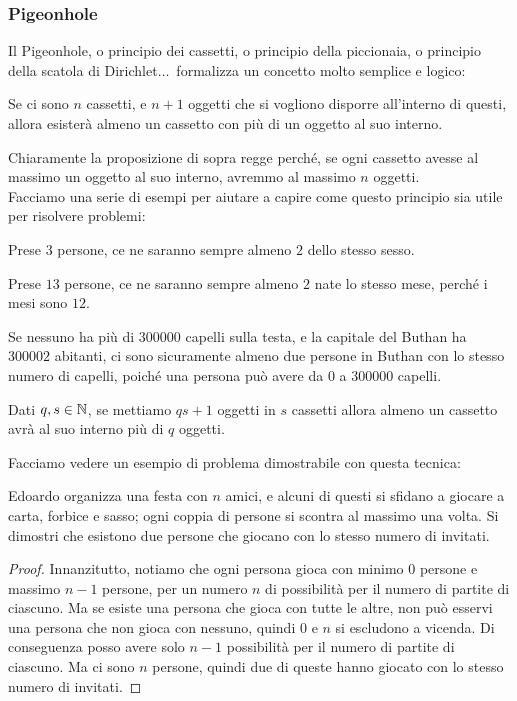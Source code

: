\documentclass[11pt]{scrartcl}
\begin{document}
	\subsubsection{Pigeonhole}
	Il Pigeonhole, o principio dei cassetti, o principio della piccionaia, o principio della scatola di Dirichlet$\dots\,$ formalizza un concetto molto semplice e logico: 
	\begin{proposition}[Pigeonhole]
		Se ci sono $n$ cassetti, e $n+1$ oggetti che si vogliono disporre all'interno di questi, allora esisterà almeno un cassetto con più di un oggetto al suo interno.
	\end{proposition}
	Chiaramente la proposizione di sopra regge perché, se ogni cassetto avesse al massimo un oggetto al suo interno, avremmo al massimo $n$ oggetti. \\
	Facciamo una serie di esempi per aiutare a capire come questo principio sia utile per risolvere problemi:
	\begin{example}
		Prese $3$ persone, ce ne saranno sempre almeno $2$ dello stesso sesso.
	\end{example}
	\begin{example}
		Prese $13$ persone, ce ne saranno sempre almeno $2$ nate lo stesso mese, perché i mesi sono $12$.
	\end{example}
	\begin{example}
		Se nessuno ha più di $300000$ capelli sulla testa, e la capitale del Buthan ha $300002$ abitanti, ci sono sicuramente almeno due persone in Buthan con lo stesso numero di capelli, poiché una persona può avere da $0$ a $300000$ capelli.
	\end{example}
	\begin{example}
		Dati $q,s\in\mathbb N$, se mettiamo $qs+1$ oggetti in $s$ cassetti allora almeno un cassetto avrà al suo interno più di $q$ oggetti.
	\end{example}
	Facciamo vedere un esempio di problema dimostrabile con questa tecnica:
	\begin{exercise}
		Edoardo organizza una festa con $n$ amici, e alcuni di questi si sfidano a giocare a carta, forbice e sasso; ogni coppia di persone si scontra al massimo una volta. Si dimostri che esistono due persone che giocano con lo stesso numero di invitati.
	\end{exercise}
	\begin{proof}
		Innanzitutto, notiamo che ogni persona gioca con minimo $0$ persone e massimo $n-1$ persone, per un numero $n$ di possibilità per il numero di partite di ciascuno. Ma se esiste una persona che gioca con tutte le altre, non può esservi una persona che non gioca con nessuno, quindi $0$ e $n$ si escludono a vicenda. Di conseguenza posso avere solo $n-1$ possibilità per il numero di partite di ciascuno. Ma ci sono $n$ persone, quindi due di queste hanno giocato con lo stesso numero di invitati. 
	\end{proof}
	
\end{document}
